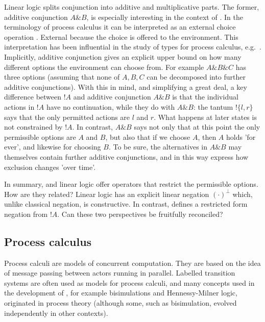 Linear logic splits conjunction into additive and multiplicative
parts. The former, additive conjunction $A \& B$, is especially
interesting in the context of \cathoristic{}. In the terminology of
process calculus it can be interpreted as an external choice operation
\cite{AbramskyS:comintoll}. External because the choice is offered to
the environment.  This interpretation has been influential in the
study of types for process calculus,
e.g.~\cite{HondaK:unitypsfsifLONG,TakeuchiK:intbaslaits,HondaK:lanpriatdfscbp}.
Implicitly, additive conjunction gives an explicit upper bound on how
many different options the environment can choose from. For example 
$A \& B \& C$ has  three options (assuming that none of $A, B, C$
can be decomposed into further additive conjunctions).  With this in
mind, and simplifying a great deal, a key difference between $!A$ and
additive conjunction $A \& B$ is that the individual actions in $!A$
have no continuation, while they do with $A \& B$: the tantum $!\{l, r\}$ says
that the only permitted  actions are $l$ and $r$. What
happens at later states is not constrained by $!A$.  In contrast, $A \&
B$ says not only that at this point the only permissible options are $A$
and $B$, but also that if we choose $A$, then $A$ holds 'for ever',
and likewise for choosing $B$. To be sure, the alternatives in $A \&
B$ may themselves contain further additive conjunctions, and in this
way express how exclusion changes 'over time'.

In summary, \cathoristic{} and linear logic offer  operators that restrict
the permissible options. How are they related? Linear logic has an
explicit linear negation $(\cdot)^{\bot}$ which, unlike classical
negation, is constructive. In contrast, \cathoristic{} defines a restricted
form negation from $!A$. Can these two perspectives be fruitfully
reconciled?

\subsection{Process calculus}

Process calculi are models of concurrent computation.  They are based
on the idea of message passing between actors running in parallel.
Labelled transition systems are often used as models for process
calculi, and many concepts used in the development of \cathoristic{},
for example bisimulations and Hennessy-Milner logic, originated in
process theory (although some, such as bisimulation, evolved
independently in other contexts).

